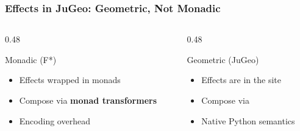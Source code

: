 \begin{frame}
\frametitle{Effects in JuGeo: Geometric, Not Monadic}
\begin{columns}[T]
\begin{column}{0.48\textwidth}
\begin{alertblock}{Monadic (F*)}
  \begin{itemize}
    \item Effects wrapped in monads
    \item Compose via \textbf{monad transformers}
    \item Encoding overhead
  \end{itemize}
\end{alertblock}
\end{column}
\begin{column}{0.48\textwidth}
\begin{exampleblock}{Geometric (JuGeo)}
  \begin{itemize}
    \item Effects are  in the site
    \item Compose via 
    \item Native Python semantics
  \end{itemize}
\end{exampleblock}
\end{column}
\end{columns}
\vspace{10pt}
\begin{center}
\end{center}
\end{frame}

